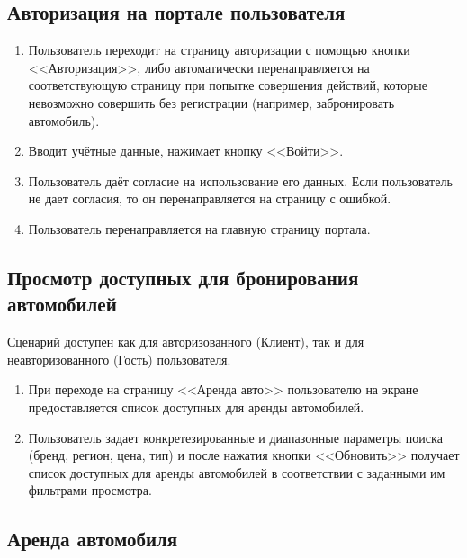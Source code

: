 \subsection*{Авторизация на портале пользователя}

\begin{enumerate}
	\item Пользователь переходит на страницу авторизации с помощью кнопки <<Авторизация>>, либо автоматически перенаправляется на соответствующую страницу при попытке совершения действий, которые невозможно совершить без регистрации (например, забронировать автомобиль).
	
	\item Вводит учётные данные, нажимает кнопку <<Войти>>.
	
	\item Пользователь даёт согласие на использование его данных. Если пользователь не дает согласия, то он перенаправляется на страницу с ошибкой.
	
	\item Пользователь перенаправляется на главную страницу портала.
\end{enumerate}

\subsection*{Просмотр доступных для бронирования автомобилей}

Сценарий доступен как для авторизованного (Клиент), так и для неавторизованного (Гость) пользователя.

\begin{enumerate}
	\item При переходе на страницу <<Аренда авто>> пользователю на экране предоставляется список доступных для аренды автомобилей.
	
	\item Пользователь задает конкретезированные и диапазонные параметры поиска (бренд, регион, цена, тип) и после нажатия кнопки <<Обновить>> получает список доступных для аренды автомобилей в соответствии с заданными им фильтрами просмотра.
\end{enumerate}

\subsection*{Аренда автомобиля}

